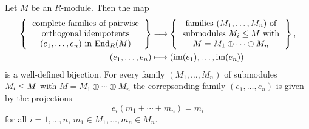 \begin{theorem}
  \label{theorem: correspondence idempotents and direct decompositions}
  Let $M$ be an $R$-module.
  Then the map
  \begin{align*}
    \left\{
      \begin{tabular}{c}
        complete families of pairwise \\
        orthogonal idempotents  \\
        $(e_1, \dotsc, e_n)$ in $\End_R(M)$
      \end{tabular}
    \right\}
    &\longto
      \left\{
      \begin{tabular}{c}
        families $(M_1, \dotsc, M_n)$ of  \\
        submodules $M_i \moduleleq M$ with \\
        $M = M_1 \oplus \dotsb \oplus M_n$
      \end{tabular}
      \right\},
    \\
                  (e_1, \dotsc, e_n)
    &\longmapsto  (\im(e_1), \dotsc, \im(e_n))
  \end{align*}
  is a well-defined bijection.
  For every family $(M_1, \dotsc, M_n)$ of submodules $M_i \leq M$ with $M = M_1 \oplus \dotsb \oplus M_n$ the correpsonding family $(e_1, \dotsc, e_n)$ is given by the projections
  \[
      e_i(m_1 + \dotsb + m_n)
    = m_i
  \]
  for all $i = 1, \dotsc, n$, $m_1 \in M_1, \dotsc, m_n \in M_n$.
\end{theorem}


